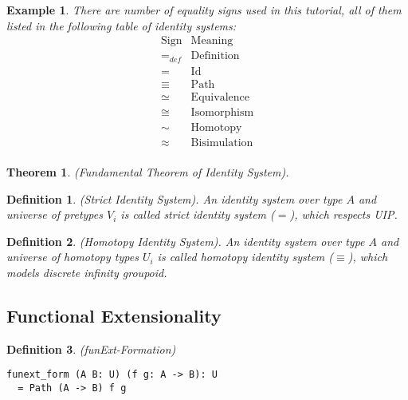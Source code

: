 \documentclass{article}
\newtheorem{definition}{Definition}
\newtheorem{theorem}{Theorem}
\newtheorem{example}{Example}
\begin{document}
\begin{example}
There are number of equality signs used in this tutorial,
all of them listed in the following table of identity systems:
$$
\begin{array}{ll} \mathrm{Sign} & \mathrm{Meaning} \\
                         \hline
                        =_{def} & \mathrm{Definition} \\
                              = & \mathrm{Id} \\
                         \equiv & \mathrm{Path} \\
                         \simeq & \mathrm{Equivalence} \\
                          \cong & \mathrm{Isomorphism} \\
                           \sim & \mathrm{Homotopy} \\
                        \approx & \mathrm{Bisimulation} \\
                      \end{array}
$$
\end{example}

\begin{theorem} (Fundamental Theorem of Identity System).
\end{theorem}

\begin{definition} (Strict Identity System).
An identity system over type $A$ and universe
of pretypes $V_i$ is called strict identity system ($=$), which respects UIP.
\end{definition}

\begin{definition} (Homotopy Identity System).
An identity system over type $A$ and universe of homotopy
types $U_i$ is called homotopy identity system ($\equiv$),
which models discrete infinity groupoid.
\end{definition}

\newpage
\subsection{Functional Extensionality}

\begin{definition} (funExt-Formation)
\begin{lstlisting}
funext_form (A B: U) (f g: A -> B): U
  = Path (A -> B) f g
\end{lstlisting}
\end{definition}
\end{document}
